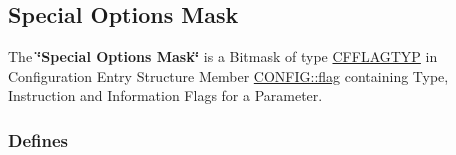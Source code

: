 \hypertarget{group__special__options__mask}{\subsection{Special Options Mask}
\label{group__special__options__mask}
}


The {\bfseries \char`\"{}\-Special Options Mask\char`\"{}} is a Bitmask of type \hyperlink{group__special__options__mask_ga4854f1596d5c6e0604a478fa9a2e23f0}{C\-F\-F\-L\-A\-G\-T\-Y\-P} in Configuration Entry Structure Member \hyperlink{struct_c_o_n_f_i_g_ab04d08abdf758c0400caaded716f4089}{C\-O\-N\-F\-I\-G\-::flag} containing Type, Instruction and Information Flags for a Parameter.  


\subsubsection*{Defines}
